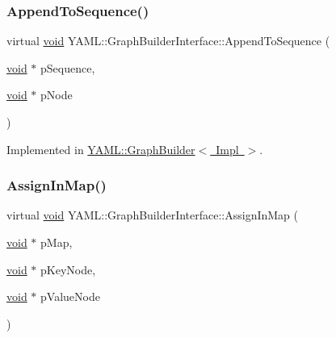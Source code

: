 \subsubsection{\texorpdfstring{AppendToSequence()}{AppendToSequence()}}
{\footnotesize\ttfamily virtual \mbox{\hyperlink{glad_8h_a950fc91edb4504f62f1c577bf4727c29}{void}} Y\+A\+M\+L\+::\+Graph\+Builder\+Interface\+::\+Append\+To\+Sequence (\begin{DoxyParamCaption}\item[{\mbox{\hyperlink{glad_8h_a950fc91edb4504f62f1c577bf4727c29}{void}} $\ast$}]{p\+Sequence,  }\item[{\mbox{\hyperlink{glad_8h_a950fc91edb4504f62f1c577bf4727c29}{void}} $\ast$}]{p\+Node }\end{DoxyParamCaption})\hspace{0.3cm}{\ttfamily [pure virtual]}}



Implemented in \mbox{\hyperlink{class_y_a_m_l_1_1_graph_builder_a50e6d0e3eed6145d9f93b0761bb67b5f}{Y\+A\+M\+L\+::\+Graph\+Builder$<$ Impl $>$}}.

\mbox{\label{class_y_a_m_l_1_1_graph_builder_interface_a11538cc1796ebac94c10e0a3bab4b746}} 
\subsubsection{\texorpdfstring{AssignInMap()}{AssignInMap()}}
{\footnotesize\ttfamily virtual \mbox{\hyperlink{glad_8h_a950fc91edb4504f62f1c577bf4727c29}{void}} Y\+A\+M\+L\+::\+Graph\+Builder\+Interface\+::\+Assign\+In\+Map (\begin{DoxyParamCaption}\item[{\mbox{\hyperlink{glad_8h_a950fc91edb4504f62f1c577bf4727c29}{void}} $\ast$}]{p\+Map,  }\item[{\mbox{\hyperlink{glad_8h_a950fc91edb4504f62f1c577bf4727c29}{void}} $\ast$}]{p\+Key\+Node,  }\item[{\mbox{\hyperlink{glad_8h_a950fc91edb4504f62f1c577bf4727c29}{void}} $\ast$}]{p\+Value\+Node }\end{DoxyParamCaption})\hspace{0.3cm}{\ttfamily [pure virtual]}}



